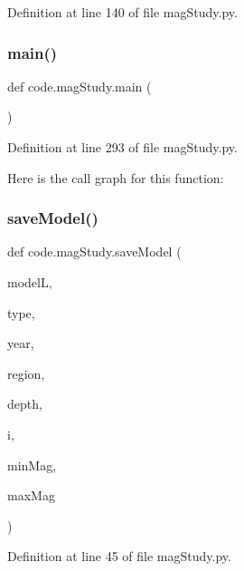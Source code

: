 Definition at line 140 of file mag\+Study.\+py.

\mbox{\label{namespacecode_1_1mag_study_a7e733f07b89cef9d42b1517cef4203f1}} 
\subsubsection{\texorpdfstring{main()}{main()}}
{\footnotesize\ttfamily def code.\+mag\+Study.\+main (\begin{DoxyParamCaption}{ }\end{DoxyParamCaption})}



Definition at line 293 of file mag\+Study.\+py.

Here is the call graph for this function\+:
\mbox{\label{namespacecode_1_1mag_study_a7eaa239d05a272f0fc379d3c1b6abf7b}} 
\subsubsection{\texorpdfstring{save\+Model()}{saveModel()}}
{\footnotesize\ttfamily def code.\+mag\+Study.\+save\+Model (\begin{DoxyParamCaption}\item[{}]{modelL,  }\item[{}]{type,  }\item[{}]{year,  }\item[{}]{region,  }\item[{}]{depth,  }\item[{}]{i,  }\item[{}]{min\+Mag,  }\item[{}]{max\+Mag }\end{DoxyParamCaption})}



Definition at line 45 of file mag\+Study.\+py.

\mbox{\label{namespacecode_1_1mag_study_a35b81b17517bc7bb23a6a412ed84b1e1}} 
